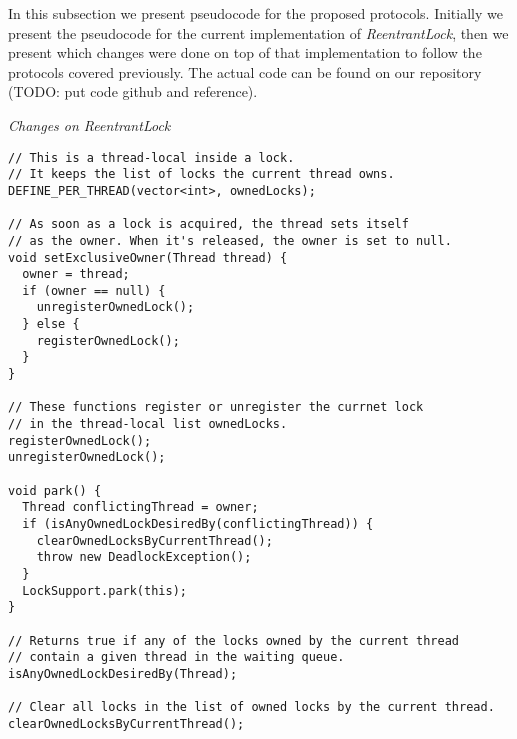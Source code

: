 In this subsection we present pseudocode for the proposed protocols. Initially we present the pseudocode for the current implementation of \emph{ReentrantLock}, then we present which changes were done on top of that implementation to follow the protocols covered previously. The actual code can be found on our repository (TODO: put code github and reference).

\medskip

\noindent
{\it Changes on ReentrantLock}
\begin{verbatim}
// This is a thread-local inside a lock.
// It keeps the list of locks the current thread owns.
DEFINE_PER_THREAD(vector<int>, ownedLocks);

// As soon as a lock is acquired, the thread sets itself
// as the owner. When it's released, the owner is set to null.
void setExclusiveOwner(Thread thread) {
  owner = thread;
  if (owner == null) {
    unregisterOwnedLock();
  } else {
    registerOwnedLock();
  }
}

// These functions register or unregister the currnet lock
// in the thread-local list ownedLocks.
registerOwnedLock();
unregisterOwnedLock();

void park() {
  Thread conflictingThread = owner;
  if (isAnyOwnedLockDesiredBy(conflictingThread)) {
    clearOwnedLocksByCurrentThread();
    throw new DeadlockException();
  }
  LockSupport.park(this);
}

// Returns true if any of the locks owned by the current thread
// contain a given thread in the waiting queue.
isAnyOwnedLockDesiredBy(Thread);

// Clear all locks in the list of owned locks by the current thread.
clearOwnedLocksByCurrentThread();
\end{verbatim}





